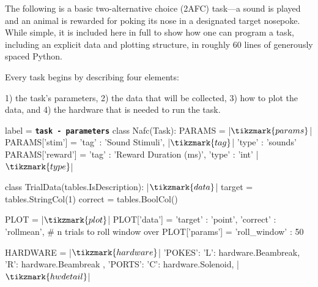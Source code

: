 The following is a basic two-alternative choice (2AFC) task---a sound is played and an animal is rewarded for poking its nose in a designated target nosepoke. While simple, it is included here in full to show how one can program a task, including an explicit data and plotting structure, in roughly 60 lines of generously spaced Python.

\vspace{12pt}

Every task begins by describing four elements: 

1) the task's parameters, 2) the data that will be collected, 3) how to plot the data, and 4) the hardware that is needed to run the task.

\begin{pythoncode*}{label = \texttt{\textbf{task - parameters}}}
class Nafc(Task):
    PARAMS = {} |$\tikzmark{params}$|
    PARAMS['stim']   = {'tag'  : 'Sound Stimuli', |$\tikzmark{tag}$|
                        'type' : 'sounds'}
    PARAMS['reward'] = {'tag'  : 'Reward Duration (ms)',
                        'type' : 'int'} |$\tikzmark{type}$|

    class TrialData(tables.IsDescription): |$\tikzmark{data}$|
        target = tables.StringCol(1)
        correct = tables.BoolCol()

    PLOT = {} |$\tikzmark{plot}$|
    PLOT['data']  =  {'target'  : 'point',
                      'correct' : 'rollmean'},
    # n trials to roll window over
    PLOT['params'] = {'roll_window' : 50}

    HARDWARE = { |$\tikzmark{hardware}$|
        'POKES':{
            'L': hardware.Beambreak,
            'R': hardware.Beambreak
        },
        'PORTS':{
            'C': hardware.Solenoid, |$\tikzmark{hwdetail}$|
        }
    }
\end{pythoncode*}
%
